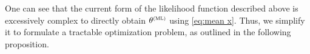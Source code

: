 %
%
One can see that the current form of the likelihood function described above is excessively complex to directly obtain $\vcthetaML$ using \eqref{eq:mean x}. Thus, we simplify it to formulate a tractable optimization problem, as outlined in the following proposition.


